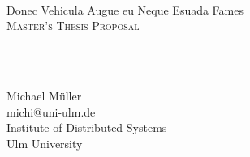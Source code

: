 {
	\parindent0pt
	\ \\ \ \\ \ \\

	\hrulefill
	\vspace{0.0cm}
	\begin{spacing}{2.1}
	{
		\flushleft
		\fontsize{22pt}{44pt}\selectfont
		Donec Vehicula Augue eu Neque Esuada Fames
	}\\
	\textsc{Master's Thesis Proposal}
	\end{spacing}

	\ \\ \ \\
	{
		Michael M\"uller\\
		michi@uni-ulm.de\\
		Institute of Distributed Systems\\
		Ulm University\par
	}
	\ \\

	\hrulefill

}
